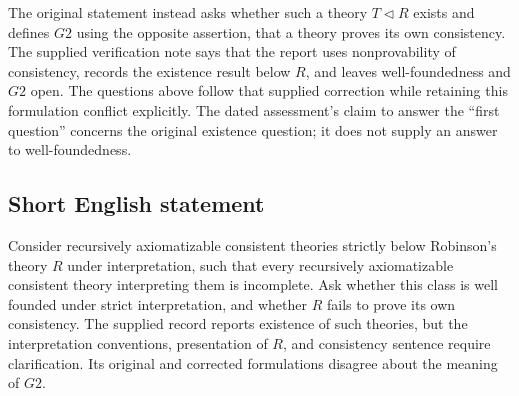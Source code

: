 \documentclass[11pt]{article}
\begin{document}
The original statement instead asks whether such a theory \(T\lhd R\) exists and defines \(G2\) using the opposite assertion, that a theory proves its own consistency. The supplied verification note says that the report uses nonprovability of consistency, records the existence result below \(R\), and leaves well-foundedness and \(G2\) open. The questions above follow that supplied correction while retaining this formulation conflict explicitly. The dated assessment's claim to answer the ``first question'' concerns the original existence question; it does not supply an answer to well-foundedness.
\subsection{Short English statement}
Consider recursively axiomatizable consistent theories strictly below Robinson's theory \(R\) under interpretation, such that every recursively axiomatizable consistent theory interpreting them is incomplete. Ask whether this class is well founded under strict interpretation, and whether \(R\) fails to prove its own consistency. The supplied record reports existence of such theories, but the interpretation conventions, presentation of \(R\), and consistency sentence require clarification. Its original and corrected formulations disagree about the meaning of \(G2\).
\end{document}
